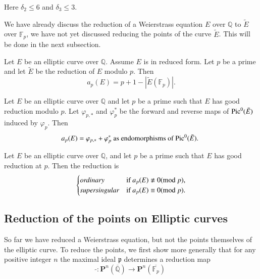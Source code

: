 Here $\delta_2\leqslant 6$ and $\delta_3\leqslant 3$. \par
We have already discuss the reduction of a Weierstrass equation $E$ over $\mathbb{Q}$ to $\tilde{E}$ over $\mathbb{F}_p$,
we have not yet discussed reducing the points of the curve $\tilde{E}$. This will be done in the next subsection.
\begin{definition}
    Let $E$ be an elliptic curve over $\mathbb{Q}$. Assume $E$ is in reduced form. Let $p$ be a prime and let $\tilde{E}$
    be the reduction of $E$ modulo $p$. Then 
    \begin{equation*}
        a_p(E)=p+1-|\tilde{E}(\mathbb{F}_p)|.
    \end{equation*}
\end{definition}
\begin{proposition}
     Let $E$ be an elliptic curve over $\mathbb{Q}$ and let $p$ be a prime such that $E$ has good reduction modulo 
     $p$. Let $\varphi _{p,*}$ and $\varphi _{p}^*$ be the forward and reverse maps of ${\rm Pic}^0(\tilde{E})$ 
     induced by $\varphi_p$. Then 
     \begin{equation*}
        a_p(E)= \varphi _{p,*}+\varphi _{p}^* \ \text{as endomorphisms of ${\rm Pic}^0(\tilde{E})$.   }
     \end{equation*} 
\end{proposition}

\begin{proposition}
    Let $E$ be an elliptic curve over $\mathbb{Q}$, and let $p$ be a prime such that $E$ has good reduction at $p$.
    Then the reduction is 
    \begin{equation*}
        \begin{cases}
            \text{\textit{ordinary}} &  \text{if } a_p(E)\nequiv0 ({\rm mod } \ p),\\
            \text{\textit{supersingular}} &  \text{if } a_p(E)\equiv 0 ({\rm mod} \ p).
        \end{cases}
    \end{equation*}
\end{proposition}

\subsection{Reduction of the points on Elliptic curves}
So far we have reduced a Weierstrass equation, but not the points themselves of the elliptic curve. To 
reduce the points, we first show more generally that for any positive integer $n$ the maximal ideal 
$\mathfrak{p}$ determines a reduction map 
\begin{equation*}
    \tilde{ }: \mathbf{P}^n(\overline{\mathbb{Q}})\longrightarrow \mathbf{P}^n(\overline{ \mathbb{F}_p})
\end{equation*}

